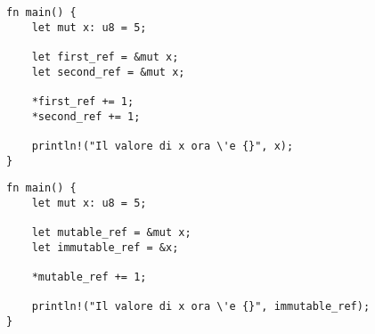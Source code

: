 \begin{lstlisting}[style=ruststyle, caption={Due reference mutabili alla stessa variabile}, label={borrow:two-mutable}]
fn main() {
    let mut x: u8 = 5;

    let first_ref = &mut x;
    let second_ref = &mut x;

    *first_ref += 1;
    *second_ref += 1;

    println!("Il valore di x ora \'e {}", x);
}
\end{lstlisting}

\begin{lstlisting}[style=ruststyle, caption={Coesistenza reference mutabile e immutabile}, label={borrow:mut-and-unmut}]
fn main() {
    let mut x: u8 = 5;

    let mutable_ref = &mut x;
    let immutable_ref = &x;

    *mutable_ref += 1;

    println!("Il valore di x ora \'e {}", immutable_ref);
}
\end{lstlisting}

